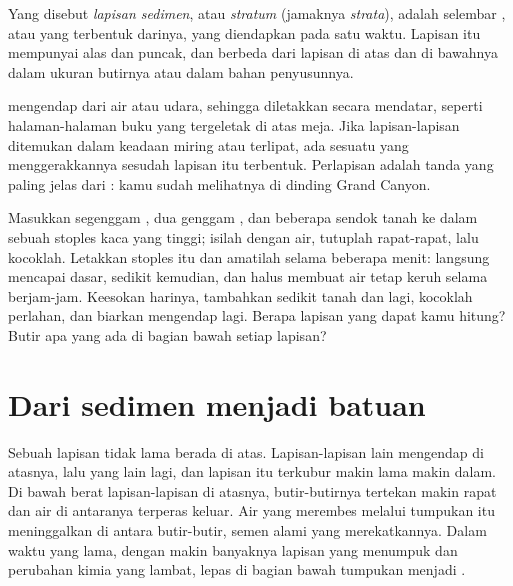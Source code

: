 \begin{definition}\label{def:g7:sediments-and-fossils:layer}
Yang disebut \emph{lapisan sedimen}, atau
\emph{stratum} (jamaknya \emph{strata}), adalah selembar
, atau  yang terbentuk darinya, yang diendapkan pada satu
waktu. Lapisan itu mempunyai alas dan puncak, dan berbeda dari lapisan di
atas dan di bawahnya dalam ukuran butirnya atau dalam bahan penyusunnya.
\end{definition}

 mengendap dari air atau udara, sehingga  diletakkan secara
mendatar, seperti halaman-halaman buku yang tergeletak di atas meja. Jika
lapisan-lapisan ditemukan dalam keadaan miring atau terlipat, ada sesuatu
yang menggerakkannya sesudah lapisan itu terbentuk. Perlapisan adalah tanda
yang paling jelas dari : kamu sudah melihatnya di dinding
Grand Canyon.

\begin{inthelab}
Masukkan segenggam , dua genggam , dan beberapa sendok tanah
ke dalam sebuah stoples kaca yang tinggi; isilah dengan air, tutuplah
rapat-rapat, lalu kocoklah. Letakkan stoples itu dan amatilah selama
beberapa menit:  langsung mencapai dasar,  sedikit kemudian,
dan  halus membuat air tetap keruh selama berjam-jam. Keesokan
harinya, tambahkan sedikit tanah dan  lagi, kocoklah perlahan, dan
biarkan mengendap lagi. Berapa lapisan yang dapat kamu hitung? Butir apa
yang ada di bagian bawah setiap lapisan?
\end{inthelab}

\section{Dari sedimen menjadi batuan}

Sebuah lapisan tidak lama berada di atas. Lapisan-lapisan lain mengendap di
atasnya, lalu yang lain lagi, dan lapisan itu terkubur makin lama makin
dalam. Di bawah berat lapisan-lapisan di atasnya, butir-butirnya tertekan
makin rapat dan air di antaranya terperas keluar. Air yang merembes melalui
tumpukan itu meninggalkan  di antara butir-butir, semen alami yang
merekatkannya. Dalam waktu yang lama, dengan makin banyaknya lapisan yang
menumpuk dan perubahan kimia yang lambat,  lepas di bagian bawah
tumpukan menjadi .

